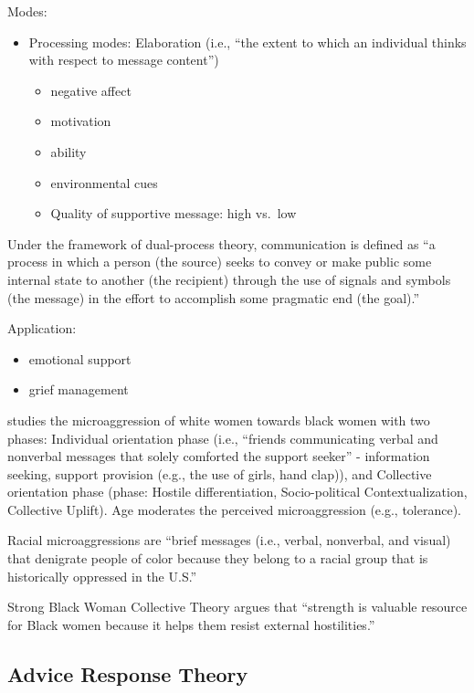 \documentclass[
]{book}
\begin{document}
Modes:

\begin{itemize}
\item
  Processing modes: Elaboration (i.e., ``the extent to which an individual thinks with respect to message content'')

  \begin{itemize}
  \item
    negative affect
  \item
    motivation
  \item
    ability
  \item
    environmental cues
  \item
    Quality of supportive message: high vs.~low
  \end{itemize}
\end{itemize}

Under the framework of dual-process theory, communication is defined as ``a process in which a person (the source) seeks to convey or make public some internal state to another (the recipient) through the use of signals and symbols (the message) in the effort to accomplish some pragmatic end (the goal).'' \citep{burleson_2010}

Application:

\begin{itemize}
\item
  emotional support
\item
  grief management
\end{itemize}

\citep{Davis_2018} studies the microaggression of white women towards black women with two phases: Individual orientation phase (i.e., ``friends communicating verbal and nonverbal messages that solely comforted the support seeker'' - information seeking, support provision (e.g., the use of girls, hand clap)), and Collective orientation phase (phase: Hostile differentiation, Socio-political Contextualization, Collective Uplift). Age moderates the perceived microaggression (e.g., tolerance).

Racial microaggressions are ``brief messages (i.e., verbal, nonverbal, and visual) that denigrate people of color because they belong to a racial group that is historically oppressed in the U.S.'' \citep{Sue_2007}

Strong Black Woman Collective Theory argues that ``strength is valuable resource for Black women because it helps them resist external hostilities.'' \citep{Davis_2014}

\hypertarget{advice-response-theory}{%
\subsection{Advice Response Theory}\label{advice-response-theory}}
\end{document}
